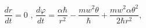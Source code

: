 \begin{equation}
\frac{dr}{dt}=0\text{ \ \ \ ,\ \ \ \ }\frac{d\varphi}{dt}=\frac{\alpha\hbar
}{r^{2}}-\frac{mw^{2}\theta}{\hbar}+\frac{mw^{2}\alpha\theta^{2}}{2\hbar
r^{2}},\label{40}%
\end{equation}

